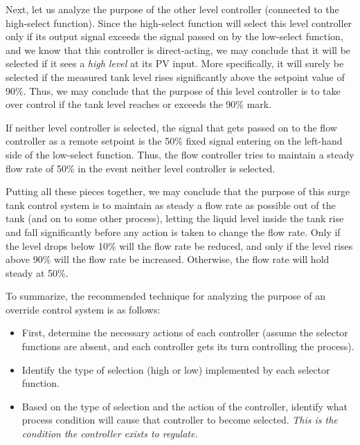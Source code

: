 Next, let us analyze the purpose of the other level controller (connected to the high-select function).  Since the high-select function will select this level controller only if its output signal exceeds the signal passed on by the low-select function, and we know that this controller is direct-acting, we may conclude that it will be selected if it sees a \textit{high level} at its PV input.  More specifically, it will surely be selected if the measured tank level rises significantly above the setpoint value of 90\%.  Thus, we may conclude that the purpose of this level controller is to take over control if the tank level reaches or exceeds the 90\% mark.

If neither level controller is selected, the signal that gets passed on to the flow controller as a remote setpoint is the 50\% fixed signal entering on the left-hand side of the low-select function.  Thus, the flow controller tries to maintain a steady flow rate of 50\% in the event neither level controller is selected.

\vskip 10pt

Putting all these pieces together, we may conclude that the purpose of this surge tank control system is to maintain as steady a flow rate as possible out of the tank (and on to some other process), letting the liquid level inside the tank rise and fall significantly before any action is taken to change the flow rate.  Only if the level drops below 10\% will the flow rate be reduced, and only if the level rises above 90\% will the flow rate be increased.  Otherwise, the flow rate will hold steady at 50\%.

\vskip 10pt

To summarize, the recommended technique for analyzing the purpose of an override control system is as follows:

\begin{itemize}
\item First, determine the necessary actions of each controller (assume the selector functions are absent, and each controller gets its turn controlling the process).
\item Identify the type of selection (high or low) implemented by each selector function.
\item Based on the type of selection and the action of the controller, identify what process condition will cause that controller to become selected.  \textit{This is the condition the controller exists to regulate.}
\end{itemize}












